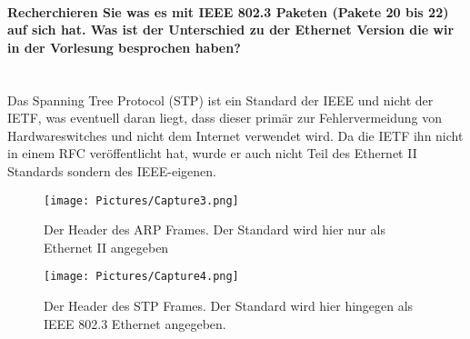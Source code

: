 \documentclass{article}
\newcommand{\paragraphlb}[1]{\paragraph{#1}\mbox{}\\}
\begin{document}
	\paragraphlb{Recherchieren Sie was es mit IEEE 802.3 Paketen (Pakete 20 bis 22) auf sich hat. Was ist der Unterschied zu der Ethernet Version die wir in der Vorlesung besprochen haben? }
	Das Spanning Tree Protocol (STP) ist ein Standard der IEEE und nicht der IETF, was eventuell daran liegt, dass dieser primär zur Fehlervermeidung von Hardwareswitches und nicht dem Internet verwendet wird. Da die IETF ihn nicht in einem RFC veröffentlicht hat, wurde er auch nicht Teil des Ethernet II Standards sondern des IEEE-eigenen.
	\begin{figure}[H]
	\centering
	\texttt{[image: Pictures/Capture3.png]}
	\caption{Der Header des ARP Frames. Der Standard wird hier nur als Ethernet II angegeben}
	\end{figure}
	\begin{figure}[H]
	\centering
	\texttt{[image: Pictures/Capture4.png]}
	\caption{Der Header des STP Frames. Der Standard wird hier hingegen als IEEE 802.3 Ethernet angegeben.}
	\end{figure}
	










	
\end{document}
